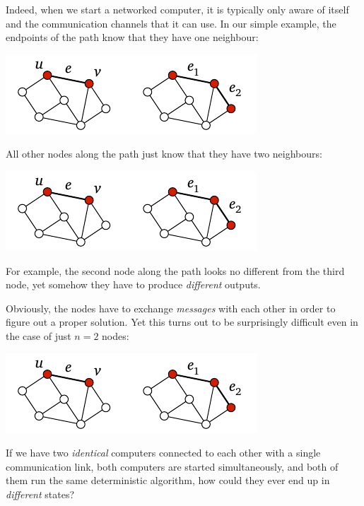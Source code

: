 Indeed, when we start a networked computer, it is typically only aware of itself and the communication channels that it can use. In our simple example, the endpoints of the path know that they have one neighbour:
\begin{center}
    \includegraphics[page=\PIntroDegOne]{figs.pdf}
\end{center}
All other nodes along the path just know that they have two neighbours:
\begin{center}
    \includegraphics[page=\PIntroDegTwo]{figs.pdf}
\end{center}
For example, the second node along the path looks no different from the third node, yet somehow they have to produce \emph{different} outputs.

Obviously, the nodes have to exchange \emph{messages} with each other in order to figure out a proper solution. Yet this turns out to be surprisingly difficult even in the case of just $n = 2$ nodes:
\begin{center}
    \includegraphics[page=\PIntroTwo]{figs.pdf}
\end{center}
If we have two \emph{identical} computers connected to each other with a single communication link, both computers are started simultaneously, and both of them run the same deterministic algorithm, how could they ever end up in \emph{different} states?

